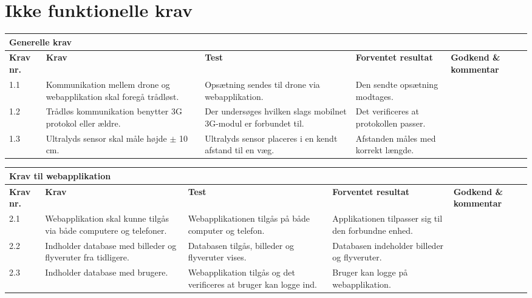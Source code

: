 \chapter{Ikke funktionelle krav}

    \centering
    \begin{tabular}{|p{}|p{3.2 cm}|p{3.2 cm}|p{3.2 cm}|p{2.2 cm}|}
			\hline
			\multicolumn{5}{|l|}{\textbf{{\large Generelle krav}}}\\ \hline
			\textbf{Krav nr.} & \textbf{Krav} & \textbf{Test} & \textbf{Forventet \newline resultat} & 			
			\textbf{Godkend \& \newline kommentar} \\ \hline
			
			1.1 & Kommunikation mellem drone og webapplikation skal foregå trådløst.
				& Opsætning sendes til drone via webapplikation.
				& Den sendte opsætning modtages.
				& \\ \hline

			1.2 & Trådløs kommunikation benytter 3G protokol eller ældre. 
				& Der undersøges hvilken slags mobilnet 3G-modul er forbundet til.
				& Det verificeres at protokollen passer.
				&  \\ \hline
			
			1.3 & Ultralyds sensor skal måle højde $\pm$ 10 cm.
				& Ultralyds sensor placeres i en kendt afstand til en væg.
				& Afstanden måles med korrekt længde.
				& \\ \hline						
		\end{tabular}

\vspace{2cm}

    \centering
    \begin{tabular}{|p{}|p{3.2 cm}|p{3.2 cm}|p{3.2 cm}|p{2.2 cm}|}
			\hline
			\multicolumn{5}{|l|}{\textbf{{\large Krav til webapplikation}}}\\ \hline
			\textbf{Krav nr.} & \textbf{Krav} & \textbf{Test} & \textbf{Forventet \newline resultat} & 			
			\textbf{Godkend \& \newline kommentar} \\ \hline
			
			2.1 & Webapplikation skal kunne tilgås via både computere og telefoner.
				& Webapplikationen tilgås på både computer og telefon.
				& Applikationen tilpasser sig til den forbundne enhed.
				& \\ \hline

			2.2 & Indholder database med billeder og flyveruter fra tidligere. 
				& Databasen tilgås, billeder og flyveruter vises.
				& Databasen indeholder billeder og flyveruter.
				&  \\ \hline
			
			2.3 & Indholder database med brugere.
				& Webapplikation tilgås og det verificeres at bruger kan logge ind.
				& Bruger kan logge på webapplikation.
				& \\ \hline				
		\end{tabular}
	\label{tab:krav_1}




